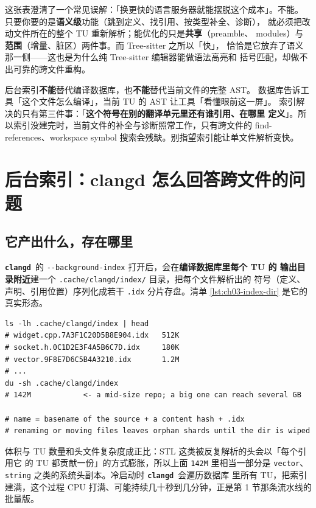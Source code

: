 \documentclass[12pt,a4paper,fontset=fandol]{ctexbook}
\newcommand{\Opt}[1]{\texttt{-\/-#1}}
\newcommand{\Lib}[1]{\textbf{\texttt{#1}}}
\newcommand{\CD}{\Lib{clangd}}
\begin{document}
这张表澄清了一个常见误解：「换更快的语言服务器就能摆脱这个成本」。不能。
只要你要的是\textbf{语义级}功能（跳到定义、找引用、按类型补全、诊断），
就必须把改动文件所在的整个 TU 重新解析；能优化的只是\textbf{共享}（preamble、
modules）与\textbf{范围}（增量、脏区）两件事。而 Tree-sitter 之所以「快」，
恰恰是它放弃了语义那一侧——这也是为什么纯 Tree-sitter 编辑器能做语法高亮和
括号匹配，却做不出可靠的跨文件重构。

\begin{note}[title={索引不是数据库，它只是跨 TU 的补充}]
后台索引\textbf{不能}替代编译数据库，也\textbf{不能}替代当前文件的完整 AST。
数据库告诉工具「这个文件怎么编译」，当前 TU 的 AST 让工具「看懂眼前这一屏」。
索引解决的只有第三件事：「\textbf{这个符号在别的翻译单元里还有谁引用、在哪里
定义}」。所以索引没建完时，当前文件的补全与诊断照常工作，只有跨文件的
find-references、workspace symbol 搜索会残缺。别指望索引能让单文件解析变快。
\end{note}

\section{后台索引：clangd 怎么回答跨文件的问题}
\label{sec:ch03-s3}

\subsection*{它产出什么，存在哪里}

\CD\ 的 \Opt{background-index} 打开后，会在\textbf{编译数据库里每个 TU 的
输出目录附近}建一个 \texttt{.cache/clangd/index/} 目录，把每个文件解析出的
符号（定义、声明、引用位置）序列化成若干 \texttt{.idx} 分片存盘。清单
\ref{lst:ch03-index-dir} 是它的真实形态。

\begin{lstlisting}[style=shellstyle,caption={.cache/clangd/index 的内容与体积量级},label={lst:ch03-index-dir}]
ls -lh .cache/clangd/index | head
# widget.cpp.7A3F1C20D5B8E904.idx   512K
# socket.h.0C1D2E3F4A5B6C7D.idx     180K
# vector.9F8E7D6C5B4A3210.idx       1.2M
# ...
du -sh .cache/clangd/index
# 142M            <- a mid-size repo; a big one can reach several GB

# name = basename of the source + a content hash + .idx
# renaming or moving files leaves orphan shards until the dir is wiped
\end{lstlisting}

体积与 TU 数量和头文件复杂度成正比：STL 这类被反复解析的头会以「每个引用它
的 TU 都贡献一份」的方式膨胀，所以上面 \texttt{142M} 里相当一部分是
\texttt{vector}、\texttt{string} 之类的系统头副本。冷启动时 \CD\ 会遍历数据库
里所有 TU，把索引建满，这个过程 CPU 打满、可能持续几十秒到几分钟，正是第 1
节那条流水线的批量版。
\end{document}
